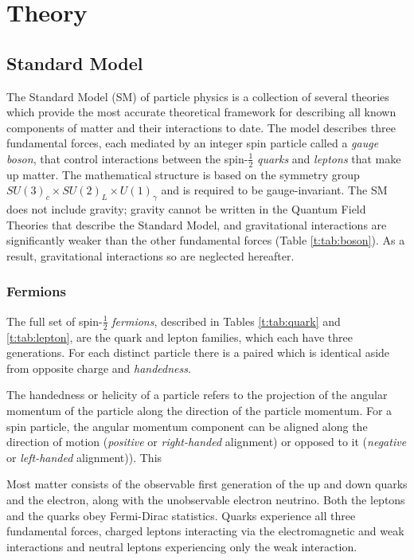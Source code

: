 \chapter{Theory}\label{c:Theory}

\section{Standard Model}


The Standard Model (SM) of particle physics is a collection of several theories which provide the most accurate theoretical framework for describing all known components of matter and their interactions to date. The model describes three fundamental forces, each mediated by an integer spin particle called a \textit{gauge boson}, that control interactions between the spin-$\frac{1}{2}$ \textit{quarks} and \textit{leptons} that make up matter. The mathematical structure is  based on the symmetry group $SU(3)_c\times SU(2)_L\times U(1)_\gamma$ and is required to be gauge-invariant. The SM does not include gravity; gravity cannot be written in the Quantum Field Theories that describe the Standard Model, and gravitational interactions are significantly weaker than the other fundamental forces (Table \ref{t:tab:boson}). As a result, gravitational interactions so are neglected hereafter.

	\subsection{Fermions}

		The full set of spin-$\frac{1}{2}$ \textit{fermions}, described in Tables \ref{t:tab:quark} and \ref{t:tab:lepton}, are the quark and lepton families, which each have three generations. For each distinct particle there is a paired  which is identical aside from opposite charge and \textit{handedness}.

		The handedness or helicity of a particle refers to the projection of the angular momentum of the particle along the direction of the particle momentum. For a spin  particle, the angular momentum component can be aligned along the direction of motion (\textit{positive} or \textit{right-handed} alignment) or opposed to it (\textit{negative} or \textit{left-handed} alignment)). This

		Most  matter consists of the observable first generation of the up and down quarks and the electron, along with the unobservable electron neutrino. Both the leptons and the quarks obey Fermi-Dirac statistics. Quarks experience all three fundamental forces, charged leptons interacting via the electromagnetic and weak interactions and neutral leptons experiencing only the weak interaction.

